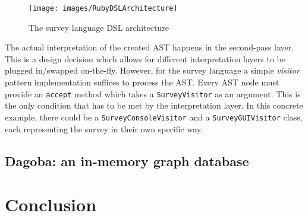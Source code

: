 \begin{figure}[!ht]
  	\centering
    	\texttt{[image: images/RubyDSLArchitecture]} 
    	\caption{The survey language DSL architecture}
    \label{fig:RubyDSLArchitecture}
\end{figure}

The actual interpretation of the created AST happens in the second-pass layer. This is a design decision which allows for different interpretation layers to be plugged in/swapped on-the-fly. However, for the survey language a simple \textit{visitor} pattern implementation suffices to process the AST. Every AST node must provide an \texttt{accept} method which takes a \texttt{SurveyVisitor} as an argument. This is the only condition that has to be met by the interpretation layer. In this concrete example, there could be a \texttt{SurveyConsoleVisitor} and a \texttt{SurveyGUIVisitor} class, each representing the survey in their own specific way.



\subsection{Dagoba: an in-memory graph database}

\section{Conclusion}